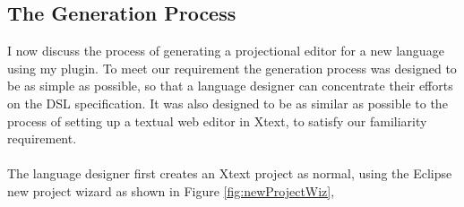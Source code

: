 \documentclass{article}
\begin{document}
\subsection{The Generation Process}
I now discuss the process of generating a projectional editor for a new language using my plugin. To meet our \RSetup requirement the generation process was designed to be as simple as possible, so that a language designer can concentrate their efforts on the DSL specification. It was also designed to be as similar as possible to the process of setting up a textual web editor in Xtext, to satisfy our familiarity \RFamiliarity requirement.
\\
\\
The language designer first creates an Xtext project as normal, using the Eclipse new project wizard as shown in Figure \ref{fig:newProjectWiz},
\end{document}
